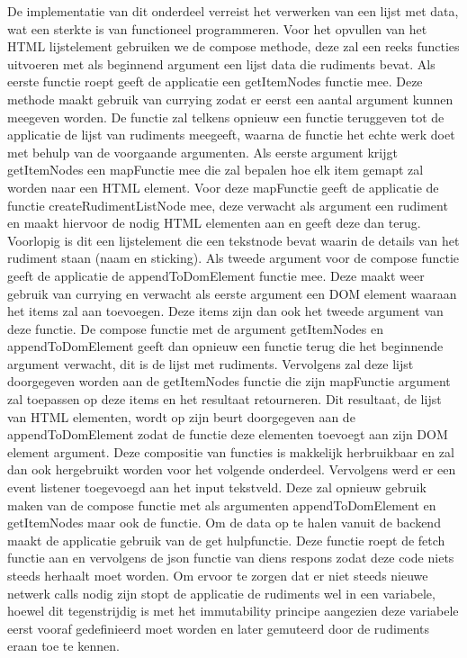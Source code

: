De implementatie van dit onderdeel verreist het verwerken van een lijst met data, wat een sterkte is van functioneel programmeren. Voor het opvullen van het HTML lijstelement gebruiken we de compose methode, deze zal een reeks functies uitvoeren met als beginnend argument een lijst data die rudiments bevat. Als eerste functie roept geeft de applicatie een getItemNodes functie mee. Deze methode maakt gebruik van currying zodat er eerst een aantal argument kunnen meegeven worden. De functie zal telkens opnieuw een functie teruggeven tot de applicatie de lijst van rudiments meegeeft, waarna de functie het echte werk doet met behulp van de voorgaande argumenten. Als eerste argument krijgt getItemNodes een mapFunctie mee die zal bepalen hoe elk item gemapt zal worden naar een HTML element. Voor deze mapFunctie geeft de applicatie de functie createRudimentListNode mee, deze verwacht als argument een rudiment en maakt hiervoor de nodig HTML elementen aan en geeft deze dan terug. Voorlopig is dit een lijstelement die een tekstnode bevat waarin de details van het rudiment staan (naam en sticking). Als tweede argument voor de compose functie geeft de applicatie de appendToDomElement functie mee. Deze maakt weer gebruik van currying en verwacht als eerste argument een DOM element waaraan het items zal aan toevoegen. Deze items zijn dan ook het tweede argument van deze functie. De compose functie met de argument getItemNodes en appendToDomElement geeft dan opnieuw een functie terug die het beginnende argument verwacht, dit is de lijst met rudiments. Vervolgens zal deze lijst doorgegeven worden aan de getItemNodes functie die zijn mapFunctie argument zal toepassen op deze items en het resultaat retourneren. Dit resultaat, de lijst van HTML elementen, wordt op zijn beurt doorgegeven aan de appendToDomElement zodat de functie deze elementen toevoegt aan zijn DOM element argument. Deze compositie van functies is makkelijk herbruikbaar en zal dan ook hergebruikt worden voor het volgende onderdeel. Vervolgens werd er een event listener toegevoegd aan het input tekstveld. Deze zal opnieuw gebruik maken van de compose functie met als argumenten appendToDomElement en getItemNodes maar ook de functie. Om de data op te halen vanuit de backend maakt de applicatie gebruik van de get hulpfunctie. Deze functie roept de fetch functie aan en vervolgens de json functie van diens respons zodat deze code niets steeds herhaalt moet worden. Om ervoor te zorgen dat er niet steeds nieuwe netwerk calls nodig zijn stopt de applicatie de rudiments wel in een variabele, hoewel dit tegenstrijdig is met het immutability principe aangezien deze variabele eerst vooraf gedefinieerd moet worden en later gemuteerd door de rudiments eraan toe te kennen.

